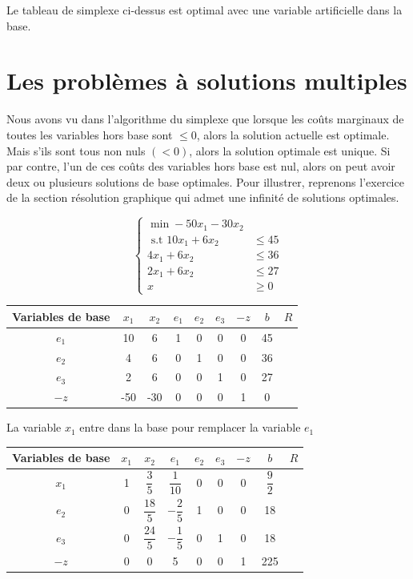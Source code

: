 \documentclass[a4paper,12pt,openany]{book}
\theoremstyle{plain}
\theoremstyle{definition}
\theoremstyle{remark}
\theoremstyle{nbstyle}
\begin{document}
	Le tableau de simplexe ci-dessus est optimal avec une variable artificielle dans la base.
	
	\section{Les problèmes à solutions multiples}
	Nous avons vu dans l'algorithme du simplexe que lorsque les coûts marginaux de toutes les variables hors base sont $\leq 0$, alors la solution actuelle est optimale. Mais s'ils sont tous non nuls $ (<0) $, alors la solution optimale est unique. Si par contre, l'un de ces coûts des variables hors base est nul, alors on peut avoir deux ou plusieurs solutions de base optimales. Pour illustrer, reprenons l'exercice de la section résolution graphique qui admet une infinité de solutions optimales.
	
	$$
	\left\{\begin{aligned}
	\displaystyle\min -50 x_{1}-30 x_{2} & \\
	\text { s.t } 10 x_{1}+6 x_{2} & \leq 45 \\
	4 x_{1}+6 x_{2} & \leq 36 \\
	2 x_{1}+6 x_{2} & \leq 27 \\
	x & \geq 0
	\end{aligned}\right.
	$$
	
	\begin{center}
		\begin{tabular}{|c|cccccc|c|c|}
			\hline
			Variables de base & $x_{1}$ & $x_{2}$ & $e_{1}$ & $e_{2}$ & $e_{3}$ & $-z$ & $b$ & $R$ \\
			\hline
			$e_{1}$ & 10 & 6 & 1 & 0 & 0 & 0 & 45 &  \\
			$e_{2}$ & 4 & 6 & 0 & 1 & 0 & 0 & 36 &  \\
			$e_{3}$ & 2 & 6 & 0 & 0 & 1 & 0 & 27 &  \\
			\hline
			$-z$ & -50 & -30 & 0 & 0 & 0 & 1 & 0 &  \\
			\hline
		\end{tabular}
	\end{center}
	
	La variable $x_{1}$ entre dans la base pour remplacer la variable $e_{1}$
	
	\begin{center}
		\begin{tabular}{|c|cccccc|c|c|}
			\hline
			Variables de base & $x_{1}$ & $x_{2}$ & $e_{1}$ & $e_{2}$ & $e_{3}$ & $-z$ & $b$ & $R$ \\
			\hline
			$x_{1}$ & 1 & $\dfrac{3}{5}$ & $\dfrac{1}{10}$ & 0 & 0 & 0 & $\dfrac{9}{2}$ &  \\
			$e_{2}$ & 0 & $\dfrac{18}{5}$ & $-\dfrac{2}{5}$ & 1 & 0 & 0 & 18 &  \\
			$e_{3}$ & 0 & $\dfrac{24}{5}$ & $-\dfrac{1}{5}$ & 0 & 1 & 0 & 18 &  \\
			\hline
			$-z$ & 0 & 0 & 5 & 0 & 0 & 1 & 225 &  \\
			\hline
		\end{tabular}
	\end{center}
	
\end{document}
